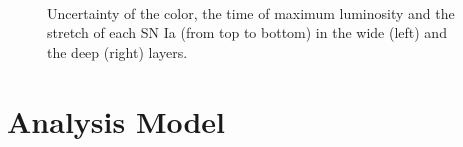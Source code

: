 \documentclass[\docopts]{\docclass}
\begin{document}
\begin{figure}[t]
\begin{center}
\\
\caption{Uncertainty of the color, the time of maximum luminosity and the stretch of each SN Ia (from top to bottom) in the wide (left) and the deep (right) layers.}
\label{fig:sigmas}
\end{center}
\end{figure}


\section{Analysis Model}
\label{sec::analysis_model}
\end{document}
